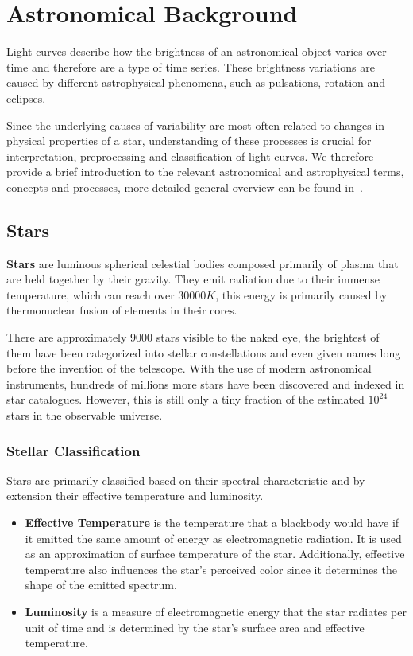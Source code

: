 \chapter{Astronomical Background}

Light curves describe how the brightness of an astronomical object varies over time and therefore are a type of time series.
These brightness variations are caused by different astrophysical phenomena, such as pulsations, rotation and eclipses.

Since the underlying causes of variability are most often related to changes in physical properties of a star, understanding of these processes is crucial for interpretation, preprocessing and classification of light curves.
We therefore provide a brief introduction to the relevant astronomical and astrophysical terms, concepts and processes, more detailed general overview can be found in~\textcite{Guidry2019}.

\section{Stars}

\textbf{Stars} are luminous spherical celestial bodies composed primarily of plasma that are held together by their gravity.
They emit radiation due to their immense temperature, which can reach over $\num{30000} K$, this energy is primarily caused by thermonuclear fusion of elements in their cores. \parencite{Girichidis2020}

There are approximately $\num{9000}$ stars visible to the naked eye, the brightest of them have been categorized into stellar constellations and even given names long before the invention of the telescope.
With the use of modern astronomical instruments, hundreds of millions more stars have been discovered and indexed in star catalogues.
However, this is still only a tiny fraction of the estimated $10^{24}$ stars in the observable universe. \parencite{Traversa2021}

\subsection{Stellar Classification}

Stars are primarily classified based on their spectral characteristic and by extension their effective temperature and luminosity.

\begin{itemize}
    \item \textbf{Effective Temperature} is the temperature that a blackbody would have if it emitted the same amount of energy as electromagnetic radiation. \linebreak
    It is used as an approximation of surface temperature of the star.
    Additionally, effective temperature also influences the star's perceived color since it determines the shape of the emitted spectrum.
    \item \textbf{Luminosity} is a measure of electromagnetic energy that the star radiates per unit of time and is determined by the star's surface area and effective temperature.
\end{itemize}

